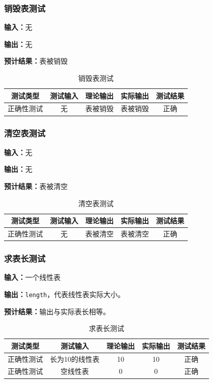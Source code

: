 \subsubsection{销毁表测试}
\textbf{输入：}无
\par
\textbf{输出：}无
\par
\textbf{预计结果：}表被销毁
\begin{table}[h]
\caption{销毁表测试}
\centering
\begin{tabular}{@{}ccccc@{}}
\toprule
\multicolumn{1}{c}{测试类型}    & \multicolumn{1}{c}{测试输入} & \multicolumn{1}{c}{理论输出} & \multicolumn{1}{c}{实际输出} & \multicolumn{1}{c}{测试结果} \\ \midrule
\multicolumn{1}{c|}{正确性测试}  & 无&表被销毁&表被销毁&正确\\ \bottomrule
\end{tabular}
\label{tab:destorytest2}
\end{table}

\subsubsection{清空表测试}
\textbf{输入：}无
\par
\textbf{输出：}无
\par
\textbf{预计结果：}表被清空
\begin{table}[h]
    \centering
    \caption{清空表测试}
    \begin{tabular}{@{}ccccc@{}}
        \toprule
        \multicolumn{1}{c}{测试类型}    & \multicolumn{1}{c}{测试输入} & \multicolumn{1}{c}{理论输出} & \multicolumn{1}{c}{实际输出} &
        \multicolumn{1}{c}{测试结果} \\ \midrule
        \multicolumn{1}{c|}{正确性测试}  &无 &表被清空&表被清空&正确\\ \bottomrule
    \end{tabular}
    \label{tab:cleartest2}
\end{table}


\subsubsection{求表长测试}
\textbf{输入：}一个线性表
\par
\textbf{输出：}\texttt{length}，代表线性表实际大小。
\par
\textbf{预计结果：}输出与实际表长相等。
\begin{table}[h]
    \centering
    \caption{求表长测试}
    \begin{tabular}{@{}ccccc@{}}
        \toprule
        \multicolumn{1}{c}{测试类型}    & \multicolumn{1}{c}{测试输入} & \multicolumn{1}{c}{理论输出} & \multicolumn{1}{c}{实际输出} &
        \multicolumn{1}{c}{测试结果} \\ \midrule
        \multicolumn{1}{c|}{正确性测试}  & 长为10的线性表&10&10&正确\\
        \multicolumn{1}{c|}{正确性测试}  & 空线性表&0&0&正确\\ \bottomrule
    \end{tabular}
    \label{tab:lengthtest2}
\end{table}

